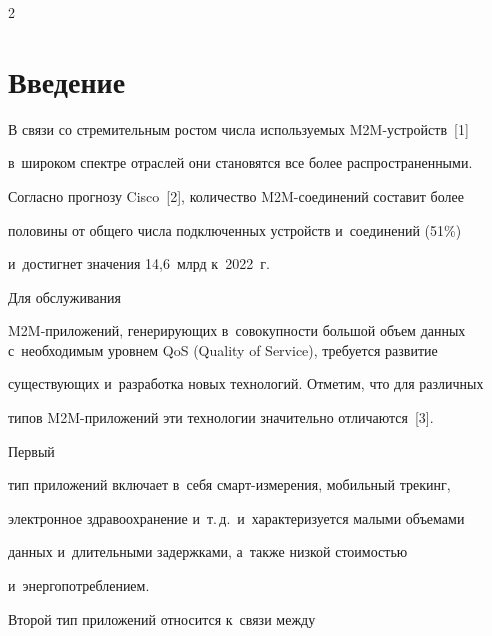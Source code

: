 \begin{multicols}{2}





\label{st\stat}





\section{Введение}





\vspace*{-2pt}





  В связи со стремительным ростом числа используемых M2M-устройств~[1] 


в~широком спектре отраслей они становятся все более распространенными. 


Согласно прогнозу Cisco~[2], количество M2M-со\-еди\-не\-ний составит более 


половины от общего числа подключенных устройств и~соединений (51\%) 


и~достигнет значения 14,6~млрд к~2022~г. 





Для обслуживания  


M2M-при\-ло\-же\-ний, генерирующих в~совокупности большой объем данных с~необходимым уровнем QoS (Quality of Service), требуется развитие 


существующих и~разработка новых технологий. Отметим, что для различных 


типов M2M-приложений эти технологии значительно отличаются~[3]. 





Первый 


тип приложений включает в~себя смарт-из\-ме\-ре\-ния, мобильный трекинг, 


электронное здравоохранение и~т.\,д.\ и~характеризуется малыми объемами 


данных и~длительными задержками, а~также низкой стоимостью 


и~энергопотреблением. 





Второй тип приложений относится к~связи между 



\end{multicols}
